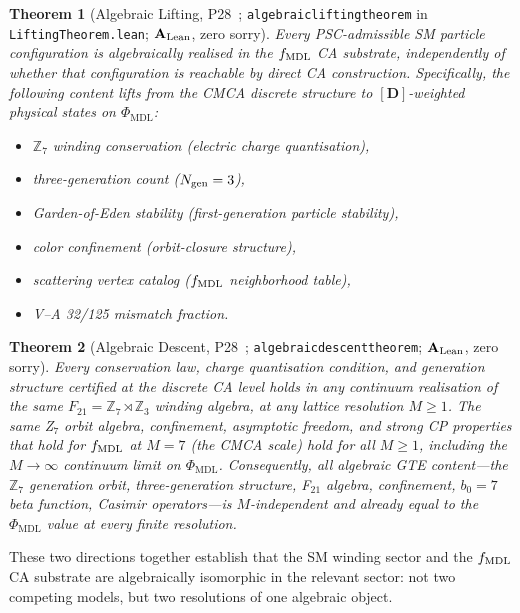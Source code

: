 \documentclass[11pt]{article}
\newtheorem{theorem}{Theorem}[section]
\theoremstyle{remark}
\newcommand{\PHIMDL}{\Phi_{\mathrm{MDL}}}
\newcommand{\ZS}{\mathbb{Z}_7}
\newcommand{\lean}[1]{%
  \penalty-100
  \begingroup\def\_{\textunderscore\allowbreak}\texttt{#1}\endgroup}
\newcommand{\CatAL}{\ensuremath{\textbf{A}_{\rm Lean}}}
\begin{document}
\begin{theorem}[Algebraic Lifting, P28~\cite{SpivackCompUniversality};
  \lean{algebraic\_lifting\_theorem} in \lean{LiftingTheorem.lean};
  $\CatAL$, zero sorry]
\label{thm:lifting}
Every PSC-admissible SM particle configuration is algebraically realised in
the $f_{\rm MDL}$ CA substrate, independently of whether that configuration
is reachable by direct CA construction.
Specifically, the following content \emph{lifts} from the CMCA discrete
structure to $[\mathbf{D}]$-weighted physical states on $\PHIMDL$:
\begin{itemize}[noitemsep]
  \item $\ZS$ winding conservation (electric charge quantisation),
  \item three-generation count ($N_{\rm gen}=3$),
  \item Garden-of-Eden stability (first-generation particle stability),
  \item color confinement (orbit-closure structure),
  \item scattering vertex catalog ($f_{\rm MDL}$ neighborhood table),
  \item V--A 32/125 mismatch fraction.
\end{itemize}
\end{theorem}

\begin{theorem}[Algebraic Descent, P28~\cite{SpivackCompUniversality};
  \lean{algebraic\_descent\_theorem}; $\CatAL$, zero sorry]
\label{thm:descent}
Every conservation law, charge quantisation condition, and generation
structure certified at the discrete CA level holds in any continuum
realisation of the same $F_{21}=\ZS\rtimes\mathbb{Z}_3$\allowbreak{}
winding algebra, at any lattice resolution $M\geq1$.
The same Z$_7$ orbit algebra, confinement, asymptotic freedom, and strong
CP properties that hold for $f_{\rm MDL}$ at $M=7$ (the CMCA scale) hold
for all $M\geq1$, including the $M\to\infty$ continuum limit on $\PHIMDL$.
Consequently, all algebraic GTE content---the $\ZS$ generation orbit,
three-generation structure, F$_{21}$ algebra, confinement, $b_0=7$ beta
function, Casimir operators---is $M$-independent and already equal to the
$\PHIMDL$ value at every finite resolution.
\end{theorem}

These two directions together establish that the SM winding sector and the
$f_{\rm MDL}$ CA substrate are algebraically isomorphic in the relevant
sector: not two competing models, but two resolutions of one algebraic
object.
\end{document}
